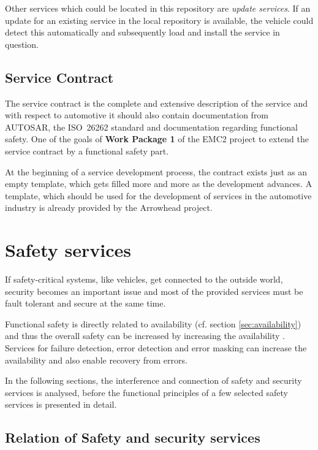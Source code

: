 Other services which could be located in this repository are \emph{update services}. If an update for an existing service in the local repository is available, the vehicle could detect this automatically and subsequently load and install the service in question.


\subsection{Service Contract}

The service contract is the complete and extensive description of the service and with respect to automotive it should also contain documentation from AUTOSAR, the \mbox{ISO 26262} standard and documentation regarding functional safety. One of the goals of \textbf{Work Package 1} of the EMC2 project to extend the service contract by a functional safety part.

At the beginning of a service development process, the contract exists just as an empty template, which gets filled more and more as the development advances. A template, which should be used for the development of services in the automotive industry is already provided by the Arrowhead project.













\section{Safety services}

If safety-critical systems, like vehicles, get connected to the outside world, security becomes an important issue and most of the provided services must be fault tolerant and secure at the same time.

Functional safety is directly related to availability (cf. section \ref{sec:availability}) and thus the overall safety can be increased by increasing the availability \cite{turek2011}. Services for failure detection, error detection and error masking can increase the availability and also enable recovery from errors.

In the following sections, the interference and connection of safety and security services is analysed, before the functional principles of a few selected safety services is presented in detail.

\subsection{Relation of Safety and security services}

